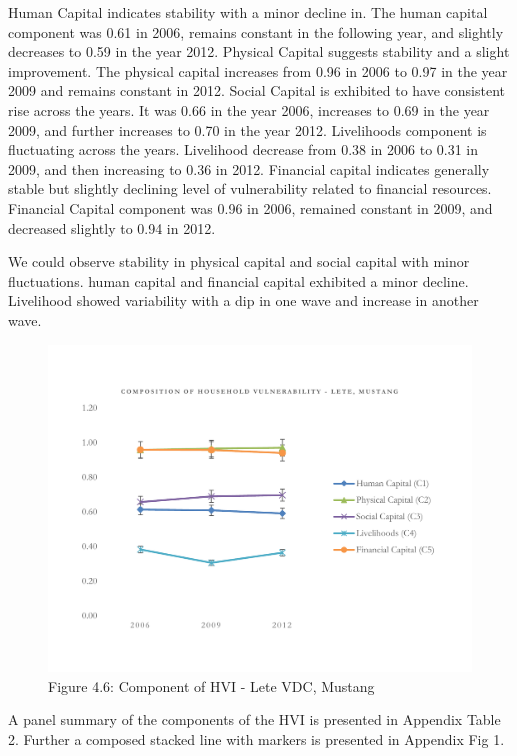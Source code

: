 \documentclass[12pt, a4paper]{article}
\begin{document}
Human Capital indicates stability with a minor decline in. The human capital component was 0.61 in 2006, remains constant in the following year, and slightly decreases to 0.59 in the year 2012. Physical Capital suggests stability and a slight improvement. The physical capital increases from 0.96 in 2006 to 0.97 in the year 2009 and remains constant in 2012. Social Capital is exhibited to have consistent rise across the years. It was 0.66 in the year 2006, increases to 0.69 in the year 2009, and further increases to 0.70 in the year 2012. Livelihoods component is fluctuating across the years. Livelihood decrease from 0.38 in 2006 to 0.31 in 2009, and then increasing to 0.36 in 2012. Financial capital indicates generally stable but slightly declining level of vulnerability related to financial resources. Financial Capital component was 0.96 in 2006, remained constant in 2009, and decreased slightly to 0.94 in 2012. 

We could observe stability in physical capital and social capital with minor fluctuations. human capital and financial capital exhibited a minor decline. Livelihood showed variability with a dip in one wave and increase in another wave. 
 
\begin{figure}[H]
	\includegraphics[scale=0.6]{HVI_Component_Lete1.pdf}
	\captionsetup{labelformat=empty}
	\caption{Figure 4.6: Component of HVI - Lete VDC, Mustang}
	\setlength{\abovecaptionskip}{1pt}
	\label{fig:hviletecomponents}
\end{figure}

A panel summary of the components of the HVI is presented in Appendix Table 2. Further a composed stacked line with markers is presented in Appendix Fig 1.
\end{document}

